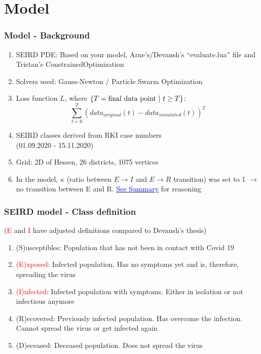 \documentclass{beamer}
\begin{document}
\section{Model}
\begin{frame}
	\frametitle{Model - Background}
	\begin{enumerate}[$\bullet$]
		\item SEIRD PDE: Based on your model, Arne's/Devansh's ``evaluate.lua'' file and Tristan's ConstrainedOptimization
		\item Solvers used: Gauss-Newton / Particle Swarm Optimization
		\item Loss function $L$, where $\{T = \text{final data point \textbar \space} t \geq T\}$:$$\sum_{t=0}^{T}(data_{original}(t) - data_{simulated}(t))^2$$ 
		\item SEIRD classes derived from RKI case numbers\\(01.09.2020 - 15.11.2020)
		\item Grid: 2D of Hessen, 26 districts, 1075 vertices
		\item In the model, $\kappa$ (ratio between $E\rightarrow I$ and $E\rightarrow R$ transition) was set to 1
			$\rightarrow$ no transition between E and R. \hyperlink{sec:StateModel}{\textcolor{blue}{See Summary}} for reasoning
	\end{enumerate}

\end{frame}

\begin{frame}
	\frametitle{SEIRD model - Class definition}
	(\textcolor{red}{E} and \textcolor{red}{I} have adjusted definitions compared to Devansh's thesis)\newline
	\begin{enumerate}[$\bullet$]
		\item (S)usceptibles: Population that has not been in contact with Covid 19
		\item \textcolor{red}{(E)xposed}: Infected population. Has no symptoms yet and is, therefore, spreading the virus
		\item \textcolor{red}{(I)nfected}: Infected population with symptoms. Either in isolation or not infectious anymore
		\item (R)ecovered: Previously infected population. Has overcome the infection. Cannot spread the virus or get infected again
		\item (D)eceased: Deceased population. Does not spread the virus
	\end{enumerate}

\end{frame}
\end{document}
